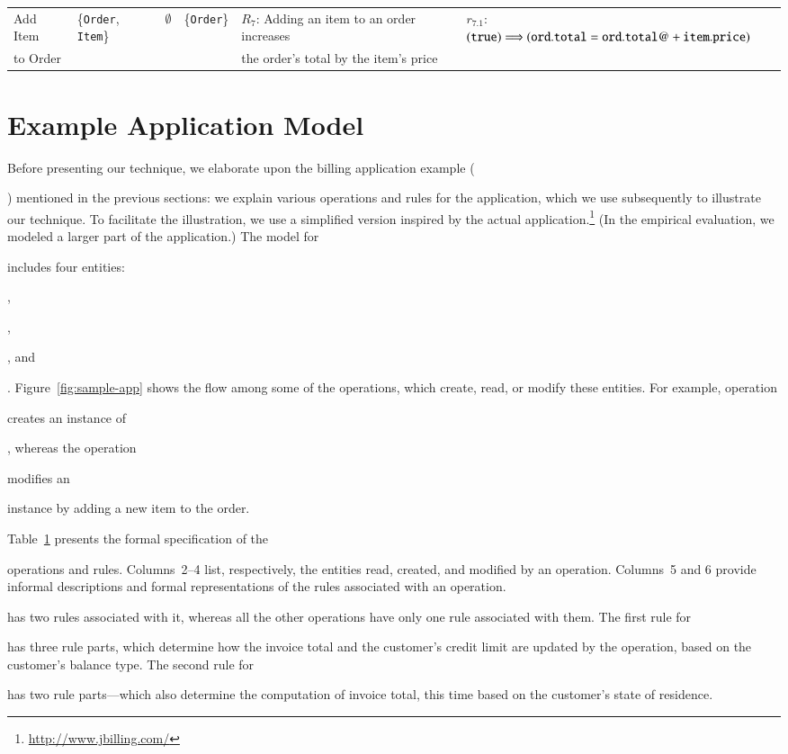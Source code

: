 \begin{table}[t]
{\begin{tabular}{|l|l|l|l|l|l|}
Add Item & \{{\tt Order}, {\tt Item}\} &
\multicolumn{1}{|c|}{$\emptyset$} & \{{\tt Order}\} &
$R_7$: Adding an item to an order increases &
$r_{7.1}$: $({\tt true}) \Longrightarrow ({\tt ord.total} = {\tt ord.total@} +
{\tt item.price})$ \\
to Order & & & & the order's total by the item's price & \\
\hline
\end{tabular}
}
\label{tab:bookstore-rules-spec}
\end{table}

\section{Example Application Model}
\label{sec:example}

Before presenting our technique, we elaborate upon the billing application
example (\subject{jBilling}) mentioned in the previous sections: we explain
various operations and rules for the application, which we use subsequently to
illustrate our technique. To facilitate the illustration, we use a simplified
version inspired by the actual application.\footnote{\scriptsize
  \url{http://www.jbilling.com/}} (In the empirical evaluation, we modeled a
larger part of the application.) The model for \subject{jBilling} includes four
entities: \subject{Customer}, \subject{Item}, \subject{Order}, and
\subject{Invoice}.  Figure~\ref{fig:sample-app} shows the flow among some of the
operations, which create, read, or modify these entities. For example, operation
\subject{CreateCustomer} creates an instance of \subject{Customer}, whereas the
operation \subject{AddItemToOrder} modifies an \subject{Order} instance by
adding a new item to the order.

Table~\ref{tab:bookstore-rules-spec} presents the formal specification of the
\subject{jBilling} operations and rules. Columns~2--4 list, respectively, the
entities read, created, and modified by an operation. Columns~5 and 6 provide
informal descriptions and formal representations of the rules associated with an
operation.  \subject{GenerateInvoice} has two rules associated with it, whereas
all the other operations have only one rule associated with them. The first rule
for \subject{GenerateInvoice} has three rule parts, which determine how the
invoice total and the customer's credit limit are updated by the operation,
based on the customer's balance type.  The second rule for
\subject{GenerateInvoice} has two rule parts---which also determine the
computation of invoice total, this time based on the customer's state of
residence.

